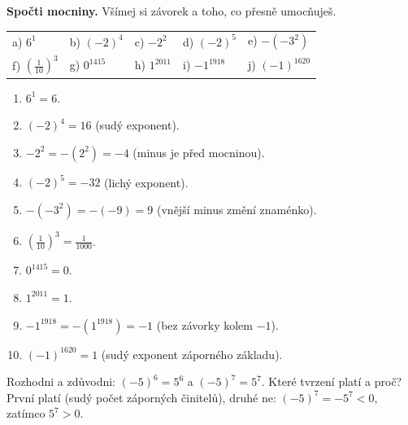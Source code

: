 \documentclass[11pt,a4paper]{article}
\begin{document}
\begin{zadaniReseniBox}[title={Samostatná práce 1},breakable=false]
\textbf{Spočti mocniny.} Všímej si závorek a toho, co přesně umocňuješ.
\begin{center}
\renewcommand{\arraystretch}{1.85}
\begin{tabularx}{\linewidth}{@{}XXXXX@{}}
a) $6^1$ & b) $(-2)^4$ & c) $-2^2$ & d) $(-2)^5$ & e) $-(-3^2)$ \\
f) $\left(\frac1{10}\right)^3$ & g) $0^{1415}$ & h) $1^{2011}$ & i) $-1^{1918}$ & j) $(-1)^{1620}$ \\
\end{tabularx}
\end{center}
\tcblower
\begin{enumerate}[label=\alph*),itemsep=.5pt]
\item $6^1=6$.
\item $(-2)^4=16$ (sudý exponent).
\item $-2^2=-(2^2)=-4$ (minus je před mocninou).
\item $(-2)^5=-32$ (lichý exponent).
\item $-(-3^2)=-(-9)=9$ (vnější minus změní znaménko).
\item $\left(\frac1{10}\right)^3=\frac1{1000}$.
\item $0^{1415}=0$.
\item $1^{2011}=1$.
\item $-1^{1918}=-(1^{1918})=-1$ (bez závorky kolem $-1$).
\item $(-1)^{1620}=1$ (sudý exponent záporného základu).
\end{enumerate}
\end{zadaniReseniBox}

\begin{zadaniReseniBox}[title={Samostatná práce 2},breakable=false]
Rozhodni a zdůvodni: $(-5)^6=5^6$ a $(-5)^7=5^7$.
Které tvrzení platí a proč?
\tcblower
První platí (sudý počet záporných činitelů), druhé ne:
$(-5)^7=-5^7<0$, zatímco $5^7>0$.
\end{zadaniReseniBox}
\end{document}
